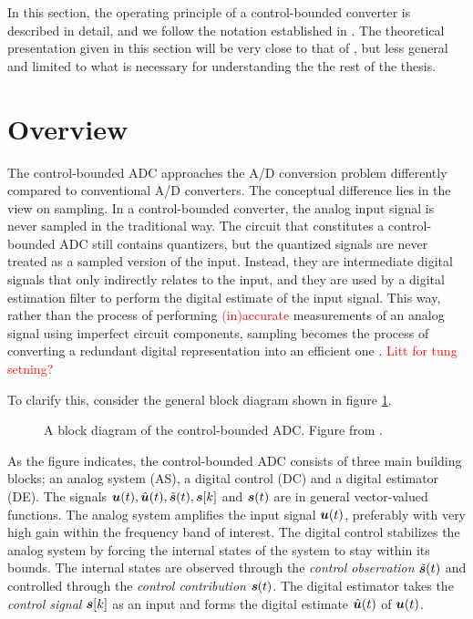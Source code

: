 In this section, the operating principle of a control-bounded converter is described in detail, and we follow the notation established in \cite{cbc_2020_loeliger}. The theoretical presentation given in this section will be very close to that of \cite{malmberg_thesis}, but less general and limited to what is necessary for understanding the the rest of the thesis.


























\section{Overview}
The control-bounded ADC approaches the A/D conversion problem differently compared to conventional A/D converters. The conceptual difference lies in the view on sampling. In a control-bounded converter, the analog input signal is never sampled in the traditional way. The circuit that constitutes a control-bounded ADC still contains quantizers, but the quantized signals are never treated as a sampled version of the input. Instead, they are intermediate digital signals that only indirectly relates to the input, and they are used by a digital estimation filter to perform the digital estimate of the input signal. This way, rather than the process of performing \textcolor{red}{(in)accurate} measurements of an analog signal using imperfect circuit components, sampling becomes the process of converting a redundant digital representation into an efficient one \cite{malmberg_thesis}. \textcolor{red}{Litt for tung setning?}

To clarify this, consider the general block diagram shown in figure \ref{fig:cbadc1}.
\begin{figure}[htbp]
    \centering
    
    \caption{A block diagram of the control-bounded ADC. Figure from \cite{malmberg_thesis}.}
    \label{fig:cbadc1}
\end{figure}

As the figure indicates, the control-bounded ADC consists of three main building blocks; an analog system (AS), a digital control (DC) and a digital estimator (DE). The signals $\bm{u}(t), \hat{\bm{u}}(t), \tilde{\bm{s}}(t), \bm{s}[k]$ and $\bm{s}(t)$ are in general vector-valued functions. The analog system amplifies the input signal $\bm{u}(t)$, preferably with very high gain within the frequency band of interest. The digital control stabilizes the analog system by forcing the internal states of the system to stay within its bounds. The internal states are observed through the \textit{control observation} $\tilde{\bm{s}}(t)$ and controlled through the \textit{control contribution} $\bm{s}(t)$. The digital estimator takes the \textit{control signal} $\bm{s}[k]$ as an input and forms the digital estimate $\hat{\bm{u}}(t)$ of $\bm{u}(t)$.

